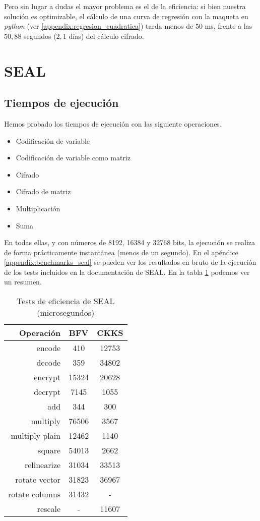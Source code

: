 Pero sin lugar a dudas el mayor problema es el de la eficiencia: si bien nuestra solución es optimizable, el cálculo de una curva de regresión con la maqueta en \textit{python} (ver \ref{appendix:regresion_cuadratica}) tarda menos de $50$ ms, frente a las $50,88$ segundos ($2,1$ días) del cálculo cifrado.

\section{SEAL}

\subsection{Tiempos de ejecución}

Hemos probado los tiempos de ejecución con las siguiente operaciones.

\begin{itemize}
    \item Codificación de variable
    \item Codificación de variable como matriz
    \item Cifrado
    \item Cifrado de matriz
    \item Multiplicación
    \item Suma
\end{itemize}

En todas ellas, y con números de 8192, 16384 y 32768 bits, la ejecución se realiza de forma prácticamente instantánea (menos de un segundo). En el apéndice \ref{appendix:benchmarks_seal} se pueden ver los resultados en bruto de la ejecución de los tests incluidos en la documentación de SEAL. En la tabla \ref{table:benchmarks_seal} podemos ver un resumen.

\begin{table}[]
    \centering
    \begin{tabular}{r | c c}
        Operación   & BFV & CKKS  \\
        \hline \hline
        encode  & 410  & 12753 \\
        decode  & 359  & 34802 \\
        encrypt & 15324 & 20628 \\
        decrypt & 7145  & 1055 \\
        add & 344 & 300 \\
        multiply  & 76506  & 3567 \\
        multiply plain  & 12462  & 1140 \\
        square  & 54013  & 2662 \\
        relinearize & 31034 & 33513 \\
        rotate vector  & 31823  & 36967 \\
        rotate columns  & 31432  & - \\
        rescale  & - & 11607
    \end{tabular}
    \caption{Tests de eficiencia de SEAL (microsegundos)}
    \label{table:benchmarks_seal}
\end{table}

